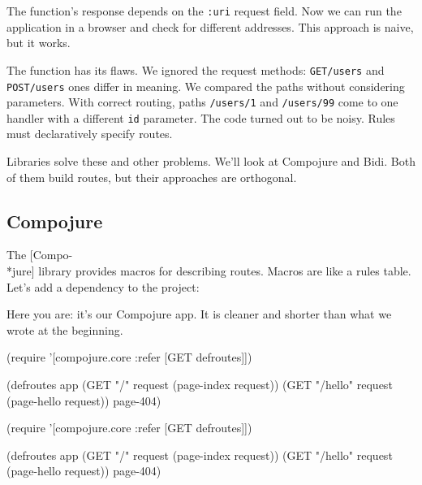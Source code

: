 The function's response depends on the \verb|:uri| request field. Now we can run the application in a browser and check for different addresses. This approach is naive, but it works.

The function has its flaws. We ignored the request methods: \verb|GET/users| and \verb|POST/users| ones differ in meaning. We compared the paths without considering parameters. With correct routing, paths \verb|/users/1| and \verb|/users/99| come to one handler with a different \verb|id| parameter. The code turned out to be noisy. Rules must declaratively specify routes.

Libraries solve these and other problems. We'll look at Compojure and Bidi. Both of them build routes, but their approaches are orthogonal.

\subsection{Compojure}

\label{compojure}


The [Compo-\\*jure] library provides macros for describing routes. Macros are like a rules table.
Let's add a dependency to the project:

\begin{clojure}
[compojure "1.6.1"]
\end{clojure}

Here you are: it's our Compojure app. It is cleaner and shorter than what we wrote at the beginning.

\ifx\DEVICETYPE\MOBILE

\begin{clojure}
(require '[compojure.core
           :refer [GET defroutes]])

(defroutes app
  (GET "/" request
    (page-index request))
  (GET "/hello" request
    (page-hello request))
  page-404)
\end{clojure}

\else

\begin{clojure}
(require '[compojure.core :refer [GET defroutes]])

(defroutes app
  (GET "/"      request (page-index request))
  (GET "/hello" request (page-hello request))
  page-404)
\end{clojure}

